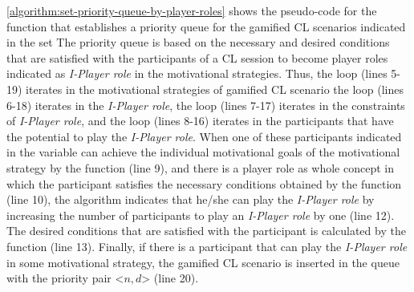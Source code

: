 \autoref{algorithm:set-priority-queue-by-player-roles} shows the pseudo-code for the function  that establishes a priority queue  for the gamified CL scenarios indicated in the set 
The priority queue is based on the necessary and desired conditions that are satisfied with the participants of a CL session  to become player roles indicated as \emph{I-Player role} in the motivational strategies.
Thus, the loop  (lines 5-19) iterates in the motivational strategies of gamified CL scenario   the loop  (lines 6-18) iterates in the \emph{I-Player role}, the loop  (lines 7-17) iterates in the constraints of \emph{I-Player role}, and the loop  (lines 8-16) iterates in the participants that have the potential to play the \emph{I-Player role}.
When one of these participants indicated in the variable  can achieve the individual motivational goals of the motivational strategy by the function  (line 9), and there is a player role as whole concept  in which the participant  satisfies the necessary conditions obtained by the function  (line 10), the algorithm indicates that he/she can play the \emph{I-Player role} by increasing the number of participants to play an \emph{I-Player role}  by one (line 12).
The desired conditions  that are satisfied with the participant  is calculated by the function  (line 13).
Finally, if there is a participant that can play the \emph{I-Player role} in some motivational strategy, the gamified CL scenario  is inserted in the queue  with the priority pair <$n,d$> (line 20).

